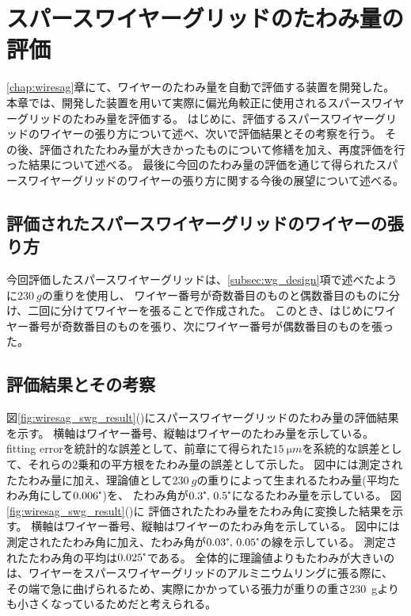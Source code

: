 \documentclass[../../main.tex]{subfiles}
\begin{document}
\chapter{スパースワイヤーグリッドのたわみ量の評価}
\label{chap:wiresag_swg}
\ref{chap:wiresag}章にて、ワイヤーのたわみ量を自動で評価する装置を開発した。
本章では、開発した装置を用いて実際に偏光角較正に使用されるスパースワイヤーグリッドのたわみ量を評価する。
はじめに、評価するスパースワイヤーグリッドのワイヤーの張り方について述べ、次いで評価結果とその考察を行う。
その後、評価されたたわみ量が大きかったものについて修繕を加え、再度評価を行った結果について述べる。
最後に今回のたわみ量の評価を通じて得られたスパースワイヤーグリッドのワイヤーの張り方に関する今後の展望について述べる。

\section{評価されたスパースワイヤーグリッドのワイヤーの張り方}
今回評価したスパースワイヤーグリッドは、\ref{subsec:wg_design}項で述べたように$\SI{230}{g}$の重りを使用し、
ワイヤー番号が奇数番目のものと偶数番目のものに分け、二回に分けてワイヤーを張ることで作成された。
このとき、はじめにワイヤー番号が奇数番目のものを張り、次にワイヤー番号が偶数番目のものを張った。

\section{評価結果とその考察}
図\ref{fig:wiresag_swg_result}()にスパースワイヤーグリッドのたわみ量の評価結果を示す。
横軸はワイヤー番号、縦軸はワイヤーのたわみ量を示している。
fitting errorを統計的な誤差として、前章にて得られた$\SI{15}{\micro m}$を系統的な誤差として、それらの2乗和の平方根をたわみ量の誤差として示した。
図中には測定されたたわみ量に加え、理論値として$\SI{230}{g}$の重りによって生まれるたわみ量(平均たわみ角にして$0.006\tcdegree$)を、
たわみ角が$0.3\tcdegree,\,0.5\tcdegree$になるたわみ量を示している。
図\ref{fig:wiresag_swg_result}()に
評価されたたわみ量をたわみ角に変換した結果を示す。
横軸はワイヤー番号、縦軸はワイヤーのたわみ角を示している。
図中には測定されたたわみ角に加え、たわみ角が$0.03\tcdegree,\,0.05\tcdegree$の線を示している。
測定されたたわみ角の平均は$0.025\tcdegree$である。
全体的に理論値よりもたわみが大きいのは、ワイヤーをスパースワイヤーグリッドのアルミニウムリングに張る際に、
その端で急に曲げられるため、実際にかかっている張力が重りの重さ\SI{230}{g}よりも小さくなっているためだと考えられる。
\end{document}
